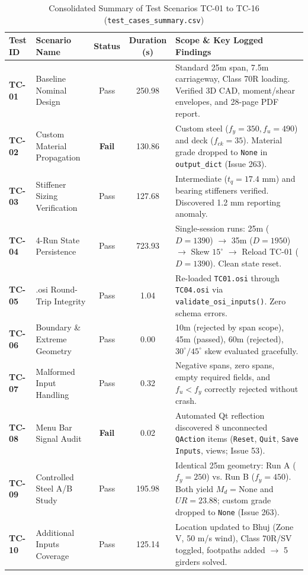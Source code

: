 \documentclass[11pt,a4paper]{article}
\begin{document}
\begin{table}[htbp]
\centering
\scriptsize
\caption{Consolidated Summary of Test Scenarios TC-01 to TC-16 (\texttt{test\_cases\_summary.csv})}
\label{tab:test_matrix}
\begin{tabularx}{\textwidth}{lp{3.5cm}ccX}
\toprule
\textbf{Test ID} & \textbf{Scenario Name} & \textbf{Status} & \textbf{Duration (s)} & \textbf{Scope \& Key Logged Findings} \\
\midrule
\textbf{TC-01} & Baseline Nominal Design & Pass & 250.98 & Standard 25m span, 7.5m carriageway, Class 70R loading. Verified 3D CAD, moment/shear envelopes, and 28-page PDF report. \\
\textbf{TC-02} & Custom Material Propagation & \textbf{Fail} & 130.86 & Custom steel ($f_y=350, f_u=490$) and deck ($f_{ck}=35$). Material grade dropped to \texttt{None} in \texttt{output\_dict} (Issue 263). \\
\textbf{TC-03} & Stiffener Sizing Verification & Pass & 127.68 & Intermediate ($t_q=17.4\text{ mm}$) and bearing stiffeners verified. Discovered 1.2 mm reporting anomaly. \\
\textbf{TC-04} & 4-Run State Persistence & Pass & 723.93 & Single-session runs: 25m ($D=1390$) $\rightarrow$ 35m ($D=1950$) $\rightarrow$ Skew $15^\circ$ $\rightarrow$ Reload TC-01 ($D=1390$). Clean state reset. \\
\textbf{TC-05} & .osi Round-Trip Integrity & Pass & 1.04 & Re-loaded \texttt{TC01.osi} through \texttt{TC04.osi} via \texttt{validate\_osi\_inputs()}. Zero schema errors. \\
\textbf{TC-06} & Boundary \& Extreme Geometry & Pass & 0.00 & 10m (rejected by span scope), 45m (passed), 60m (rejected), $30^\circ/45^\circ$ skew evaluated gracefully. \\
\textbf{TC-07} & Malformed Input Handling & Pass & 0.32 & Negative spans, zero spans, empty required fields, and $f_u < f_y$ correctly rejected without crash. \\
\textbf{TC-08} & Menu Bar Signal Audit & \textbf{Fail} & 0.02 & Automated Qt reflection discovered 8 unconnected \texttt{QAction} items (\texttt{Reset}, \texttt{Quit}, \texttt{Save Inputs}, views; Issue 53). \\
\textbf{TC-09} & Controlled Steel A/B Study & Pass & 195.98 & Identical 25m geometry: Run A ($f_y=250$) vs. Run B ($f_y=450$). Both yield $M_d = \text{None}$ and $UR = 23.88$; custom grade dropped to \texttt{None} (Issue 263). \\
\textbf{TC-10} & Additional Inputs Coverage & Pass & 125.14 & Location updated to Bhuj (Zone V, 50 m/s wind), Class 70R/SV toggled, footpaths added $\rightarrow$ 5 girders solved. \\

\end{tabularx}
\end{table}
\end{document}
